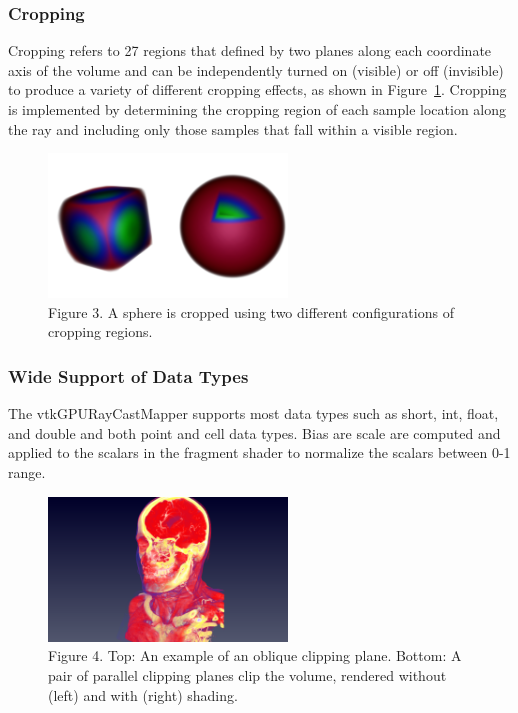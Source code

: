 \subsubsection{Cropping}
Cropping refers to 27 regions that defined by two planes along each coordinate axis of the volume and can be independently turned on (visible) or off (invisible) to produce a variety of different cropping effects, as shown in Figure~\ref{fig:cropping}. Cropping is implemented by determining the cropping region of each sample location along the ray and including only those samples that fall within a visible region.

\begin{figure}
\centering
\includegraphics[width=2.5in]{SphereCropping.png}
\caption{Figure 3. A sphere is cropped using two different configurations of cropping regions.}
\label{fig:cropping}
\end{figure}

\subsubsection{Wide Support of Data Types} 
The vtkGPURayCastMapper supports most data types such as short, int, float, and double and both point and cell data types. Bias are scale are computed and applied to the scalars in the fragment shader to normalize the scalars between 0-1 range. 

\begin{figure}
\centering
\includegraphics[width=2.5in]{HeadClippingOblique.png}
\caption{Figure 4. Top: An example of an oblique clipping plane. Bottom: A pair of parallel clipping planes clip the volume, rendered without (left) and with (right) shading.}
\label{fig:clipping}
\end{figure}

